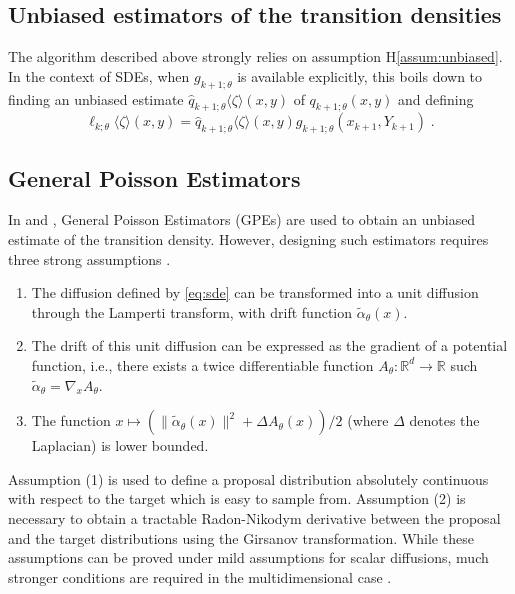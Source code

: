 \documentclass{article}
\newcommand{\md}[1]{g_{#1}}
\newcommand{\parvec}{\theta}
\newcommand{\hd}[1]{q_{#1}}
\newcommand{\hdhat}[1]{\widehat{q}_{#1}}
\newcommand{\rset}{\ensuremath{\mathbb{R}}}
\newcommand{\eqsp}{\;}
\newcommand{\hatqg}[1]{\mathsf{\ell}_{#1}}
\begin{document}
\subsection{Unbiased estimators of the transition densities}

The algorithm described above strongly relies on assumption H\ref{assum:unbiased}. 
In the context of SDEs, when $\md{k+1;\parvec}$ is available explicitly, this boils down to finding an unbiased estimate $\hdhat{k+1;\parvec}\langle \zeta\rangle(x,y)$ of $\hd{k+1;\parvec}(x,y)$ and defining
\[
\hatqg{k;\parvec}\langle \zeta\rangle(x,y) = \hdhat{k+1;\parvec}\langle \zeta\rangle(x,y)\md{k+1;\parvec}(x_{k+1},Y_{k+1})\eqsp.
\]

\subsection{General Poisson Estimators}
In \cite{olsson2011particle} and \cite{gloaguen2018online}, General Poisson Estimators (GPEs) are used to obtain an unbiased estimate of the transition density.  However, designing such estimators requires three strong assumptions \cite{beskos2006retrospective}.

\begin{enumerate}
\item The diffusion defined by \eqref{eq:sde} can be transformed into a unit diffusion through the Lamperti transform, with drift function $\tilde{\alpha}_\parvec(x)$.
\item The drift of this unit diffusion can be expressed as the gradient of a potential function, i.e., there exists a twice differentiable function $A_{\parvec}:\mathbb{R}^d \to \rset$ such $\tilde{\alpha}_{\parvec} = \nabla_x A_{\parvec}$.
\item The function $x\mapsto (\|\tilde{\alpha}_{\parvec}(x)\|^2 + \Delta A_{\parvec}(x))/2$ (where $\Delta$ denotes the Laplacian) is lower bounded.
\end{enumerate}

Assumption (1)
 is used to define a proposal distribution absolutely continuous with respect to the target which is easy to sample from. 
Assumption (2)
 is necessary to obtain a tractable Radon-Nikodym derivative between the proposal and the target distributions using the Girsanov transformation. 
 While these assumptions can be proved under mild assumptions for scalar diffusions, much stronger conditions are required in the multidimensional case \cite{ait-sahalia2008closed}. 
\end{document}

